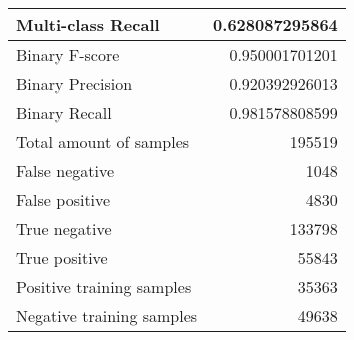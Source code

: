 \begin{table}[H]
\begin{minipage}{0.5\textwidth}
\begin{tabular}{l r}
Multi-class Recall & 0.628087295864 \\
\midrule
Binary F-score & 0.950001701201 \\
Binary Precision & 0.920392926013 \\
Binary Recall & 0.981578808599 \\
\midrule
Total amount of samples & 195519 \\
False negative & 1048 \\
False positive & 4830 \\
True negative & 133798 \\
True positive & 55843 \\
\midrule
Positive training samples & 35363 \\
Negative training samples & 49638 \\
\bottomrule
\end{tabular}
\end{minipage}
\end{table}
